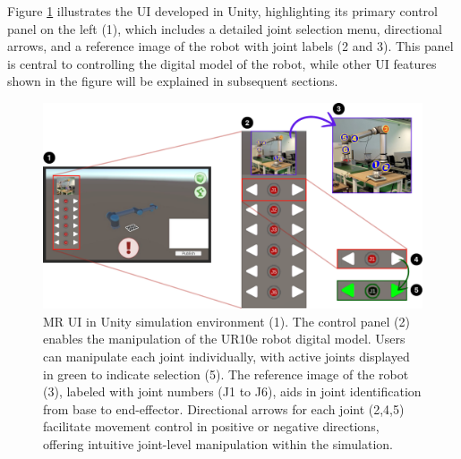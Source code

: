Figure \ref{f:ui-control} illustrates the \ac{UI} developed in Unity, highlighting its primary control panel on the left (1), which includes a detailed joint selection menu, directional arrows, and a reference image of the robot with joint labels (2 and 3). This panel is central to controlling the digital model of the robot, while other \ac{UI} features shown in the figure will be explained in subsequent sections.

\begin{figure}[h]
    \centering
    \includegraphics[width=\textwidth]{figs/interface-numerada-2.png}
    \caption{\ac{MR} \ac{UI} in Unity simulation environment (1). The control panel (2) enables the manipulation of the UR10e robot digital model. Users can manipulate each joint individually, with active joints displayed in green to indicate selection (5). The reference image of the robot (3), labeled with joint numbers (J1 to J6), aids in joint identification from base to end-effector. Directional arrows for each joint (2,4,5) facilitate movement control in positive or negative directions, offering intuitive joint-level manipulation within the simulation.}
    \label{f:ui-control}
\end{figure}


